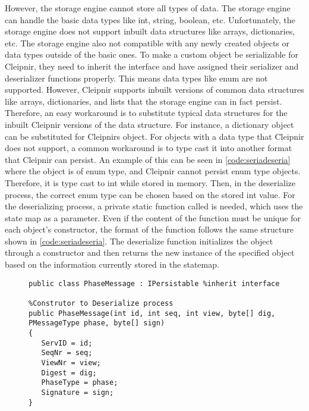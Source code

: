 However, the storage engine cannot store all types of data. The storage engine can handle the basic data types like int, string, boolean, etc. Unfortunately, the storage engine does not support inbuilt data structures like arrays, dictionaries, etc. The storage engine also not compatible with any newly created objects or data types outside of the basic ones. To make a custom object be serializable for Cleipnir, they need to inherit the  interface and have assigned their serializer and deserializer functions properly. This means data types like enum are not supported. However, Cleipnir supports inbuilt versions of common data structures like arrays, dictionaries, and lists that the storage engine can in fact persist. Therefore, an easy workaround is to substitute typical data structures for the inbuilt Cleipnir versions of the data structure. For instance, a dictionary object can be substituted for Cleipnirs  object. For objects with a data type that Cleipnir does not support, a common workaround is to type cast it into another format that Cleipnir can persist. 
An example of this can be seen in \autoref{code:seriadeseria} where the object  is of enum type, and Cleipnir cannot persist enum type objects. Therefore, it is type cast to int while stored in memory. Then, in the deserialize process, the correct enum type can be chosen based on the stored int value. For the deserializing process, a private static function called  is needed, which uses the state map as a parameter. Even if the content of the function must be unique for each object’s constructor, the format of the function follows the same structure shown in \autoref{code:seriadeseria}. The deserialize function initializes the object through a constructor and then returns the new instance of the specified object based on the information currently stored in the statemap.

\begin{figure}[H]
	\centering
	\begin{lstlisting}[label = code:interfaceexample, caption=Object persistentcy initializer, captionpos=b, basicstyle=\scriptsize]
public class PhaseMessage : IPersistable %inherit interface
		
%Construtor to Deserialize process
public PhaseMessage(int id, int seq, int view, byte[] dig, PMessageType phase, byte[] sign)
{
   ServID = id;
   SeqNr = seq;
   ViewNr = view;
   Digest = dig;
   PhaseType = phase;
   Signature = sign;
}
	\end{lstlisting}
\end{figure}

